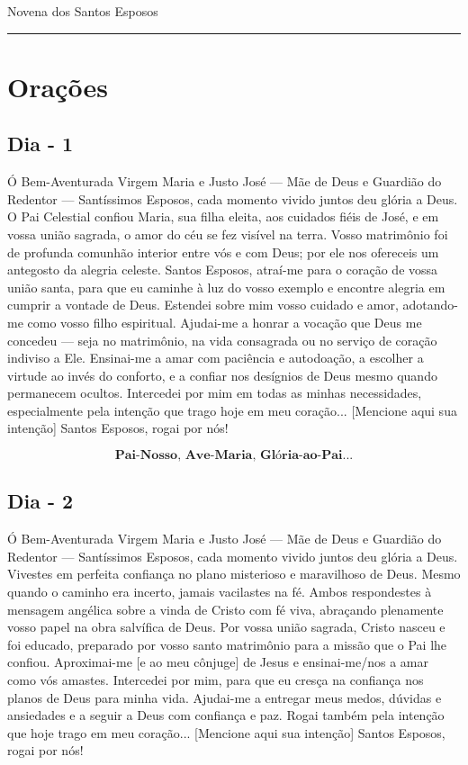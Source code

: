 \documentclass[a4paper,14pt]{extarticle} \usepackage[utf8]{inputenc}
\begin{document}



\begin{center}
  {\huge Novena dos Santos Esposos}
\end{center}



\noindent\rule{\textwidth}{0.4pt}
\tableofcontents
\thispagestyle{empty}


\newpage


\vfill

\section{Orações}

\subsection{Dia - 1}

Ó Bem-Aventurada Virgem Maria e Justo José — Mãe de Deus e Guardião do Redentor — Santíssimos Esposos, cada momento vivido juntos deu glória a Deus.
O Pai Celestial confiou Maria, sua filha eleita, aos cuidados fiéis de José, e em vossa união sagrada, o amor do céu se fez visível na terra. Vosso matrimônio foi de profunda comunhão interior entre vós e com Deus; por ele nos ofereceis um antegosto da alegria celeste.
Santos Esposos, atraí-me para o coração de vossa união santa, para que eu caminhe à luz do vosso exemplo e encontre alegria em cumprir a vontade de Deus. Estendei sobre mim vosso cuidado e amor, adotando-me como vosso filho espiritual.
Ajudai-me a honrar a vocação que Deus me concedeu — seja no matrimônio, na vida consagrada ou no serviço de coração indiviso a Ele. Ensinai-me a amar com paciência e autodoação, a escolher a virtude ao invés do conforto, e a confiar nos desígnios de Deus mesmo quando permanecem ocultos. Intercedei por mim em todas as minhas necessidades, especialmente pela intenção que trago hoje em meu coração... [Mencione aqui sua intenção] Santos Esposos, rogai por nós!

\[\textbf{Pai-Nosso, Ave-Maria, Glória-ao-Pai...}\]
\subsection{Dia - 2}

Ó Bem-Aventurada Virgem Maria e Justo José — Mãe de Deus e Guardião do Redentor — Santíssimos Esposos, cada momento vivido juntos deu glória a Deus.
Vivestes em perfeita confiança no plano misterioso e maravilhoso de Deus. Mesmo quando o caminho era incerto, jamais vacilastes na fé. Ambos respondestes à mensagem angélica sobre a vinda de Cristo com fé viva, abraçando plenamente vosso papel na obra salvífica de Deus. Por vossa união sagrada, Cristo nasceu e foi educado, preparado por vosso santo matrimônio para a missão que o Pai lhe confiou.
Aproximai-me [e ao meu cônjuge] de Jesus e ensinai-me/nos a amar como vós amastes. Intercedei por mim, para que eu cresça na confiança nos planos de Deus para minha vida. Ajudai-me a entregar meus medos, dúvidas e ansiedades e a seguir a Deus com confiança e paz. Rogai também pela intenção que hoje trago em meu coração... [Mencione aqui sua intenção] Santos Esposos, rogai por nós!
\end{document}
